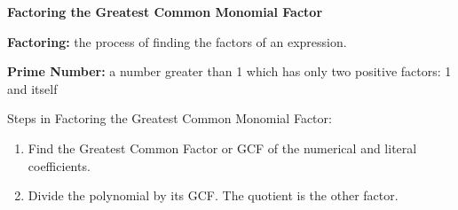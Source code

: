 \begin{center}
\textbf{Factoring the Greatest Common Monomial Factor}
\end{center}

\vspace*{1ex}

\textbf{Factoring:} the process of finding the factors of an expression. 

\vspace*{7mm}

\textbf{Prime Number: } a number greater than 1 which  has only two positive factors: 1 and itself

\vspce

Steps in Factoring the Greatest Common Monomial Factor:

\begin{enumerate}
\item Find the Greatest Common Factor or GCF of the numerical and literal coefficients.     
\item Divide the polynomial by its GCF. The quotient is the other factor.
\end{enumerate}